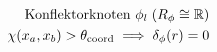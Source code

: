 \documentclass[preview]{standalone}
\begin{document}
\begin{align*}
\special{dvisvgm:raw <g id='unique000'>}\text{Konflektorknoten }\phi_l\;(R_\phi\cong\mathbb{R})\\\chi(x_a, x_b) > \theta_{\text{coord}} \implies \delta_\phi(r)=0\special{dvisvgm:raw </g>}
\end{align*}
\end{document}
